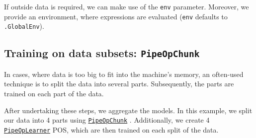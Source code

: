 \documentclass[]{scrbook}
\newenvironment{Shaded}{\begin{snugshade}}{\end{snugshade}}
\newcommand{\CommentTok}[1]{\textcolor[rgb]{0.56,0.35,0.01}{\textit{#1}}}
\newcommand{\DataTypeTok}[1]{\textcolor[rgb]{0.13,0.29,0.53}{#1}}
\newcommand{\DecValTok}[1]{\textcolor[rgb]{0.00,0.00,0.81}{#1}}
\newcommand{\KeywordTok}[1]{\textcolor[rgb]{0.13,0.29,0.53}{\textbf{#1}}}
\newcommand{\NormalTok}[1]{#1}
\newcommand{\OperatorTok}[1]{\textcolor[rgb]{0.81,0.36,0.00}{\textbf{#1}}}
\newcommand{\StringTok}[1]{\textcolor[rgb]{0.31,0.60,0.02}{#1}}
\renewenvironment{Shaded} {\begin{snugshade}\small} {\end{snugshade}}
\begin{document}
\begin{Shaded}
\end{Shaded}

If outside data is required, we can make use of the \texttt{env} parameter.
Moreover, we provide an environment, where expressions are evaluated (\texttt{env} defaults to \texttt{.GlobalEnv}).

\hypertarget{training-on-data-subsets-pipeopchunk}{%
\subsection{\texorpdfstring{Training on data subsets: \texttt{PipeOpChunk}}{Training on data subsets: PipeOpChunk}}\label{training-on-data-subsets-pipeopchunk}}

In cases, where data is too big to fit into the machine's memory, an often-used technique is to split the data into several parts.
Subsequently, the parts are trained on each part of the data.

After undertaking these steps, we aggregate the models.
In this example, we split our data into 4 parts using \href{https://mlr3pipelines.mlr-org.com/reference/mlr_pipeops_chunk.html}{\texttt{PipeOpChunk}} .
Additionally, we create 4 \href{https://mlr3pipelines.mlr-org.com/reference/mlr_pipeops_learner.html}{\texttt{PipeOpLearner}} POS, which are then trained on each split of the data.

\begin{Shaded}
\end{Shaded}
\end{document}

